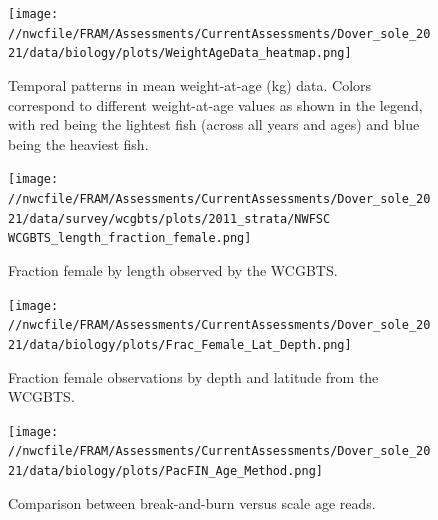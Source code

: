 \documentclass[11pt,
  english,
  a4paper,
]{article}
\begin{document}
\tagmcend\tagstructend


\begin{figure}
\centering
\texttt{[image: //nwcfile/FRAM/Assessments/CurrentAssessments/Dover\_sole\_2021/data/biology/plots/WeightAgeData\_heatmap.png]}
\caption{Temporal patterns in mean weight-at-age (kg) data. Colors correspond to different weight-at-age values as shown in the legend, with red being the lightest fish (across all years and ages) and blue being the heaviest fish.\label{fig:tv-wght-at-age}}
\end{figure}

\tagmcend\tagstructend


\begin{figure}
\centering
\texttt{[image: //nwcfile/FRAM/Assessments/CurrentAssessments/Dover\_sole\_2021/data/survey/wcgbts/plots/2011\_strata/NWFSC WCGBTS\_length\_fraction\_female.png]}
\caption{Fraction female by length observed by the WCGBTS.\label{fig:sex-by-len}}
\end{figure}

\tagmcend\tagstructend


\begin{figure}
\centering
\texttt{[image: //nwcfile/FRAM/Assessments/CurrentAssessments/Dover\_sole\_2021/data/biology/plots/Frac\_Female\_Lat\_Depth.png]}
\caption{Fraction female observations by depth and latitude from the WCGBTS.\label{fig:fem-by-lat-depth}}
\end{figure}

\tagmcend\tagstructend


\begin{figure}
\centering
\texttt{[image: //nwcfile/FRAM/Assessments/CurrentAssessments/Dover\_sole\_2021/data/biology/plots/PacFIN\_Age\_Method.png]}
\caption{Comparison between break-and-burn versus scale age reads.\label{fig:scale-age}}
\end{figure}
\end{document}
